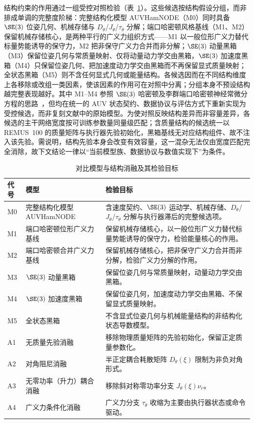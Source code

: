 结构约束的作用通过一组受控对照检验（表~\ref{tab:model-comparison-roles}）。这些候选按结构假设分组，而非排成单调的完整度阶梯：完整结构化模型 AUVHamNODE（M0）同时具备 \(\SE(3)\) 位姿几何、机械存储与 \(D_\theta\)/\(J_\theta\)/\(\tau_\theta\) 分解；端口哈密顿风格基线（M1、M2）保留机械存储核心，是两种平行的广义力组织方式——M1 以一般位形广义力替代标量势能诱导的保守力，M2 把非保守广义力合并而非分解；\(\SE(3)\) 动量黑箱（M3）保留位姿几何与常质量映射、仅将动量动力学交由黑箱，\(\SE(3)\) 加速度黑箱（M4）只保留位姿几何、把加速度动力学交由黑箱而不再保留显式质量映射；全状态黑箱（M5）则不含任何显式几何或能量结构。各候选因而在不同结构维度上各移除或改组一类因素，使该因素的作用可在对照中分离；分组本身不预设结构越完整表现越好。其中 M1--M4 参照 \(\SE(3)\) 哈密顿及李群端口哈密顿神经常微分方程的思路~\citep{duong2021se3hamnode,duong2024liegroupphnode}，但均在统一的 AUV 状态契约、数据协议与评估方式下重新实现为受控候选，而非复刻文献中的原始模型。为使对照反映结构差异而非容量差异，各候选的主干网络宽度按可训练参数量同量级匹配；含质量结构的候选统一以 REMUS~100 的质量矩阵与执行器先验初始化，黑箱基线无对应结构组件、故不注入该先验。需说明，结构先验本身会改变有效容量，这一混杂无法仅由宽度匹配完全消除，故下文结论一律以“当前模型族、数据协议与数值实现下”为条件。

\begin{table}[htbp]
  \centering
  \caption{对比模型与结构消融及其检验目标}
  \label{tab:model-comparison-roles}
  \begin{tabularx}{\textwidth}{l>{\raggedright\arraybackslash}p{}>{\raggedright\arraybackslash}X}
    \toprule
    代号 & 模型 & 检验目标 \\
    \midrule
    M0 & 完整结构化模型 AUVHamNODE & 含速度契约、\(\SE(3)\) 运动学、机械存储、\(D_\theta\)/\(J_\theta\)/\(\tau_\theta\) 分解与执行器滞后的完整候选项。 \\
    M1 & 端口哈密顿位形广义力基线 & 保留机械存储核心，以一般位形广义力替代标量势能诱导的保守力，检验能量核心的作用。 \\
    M2 & 端口哈密顿合并广义力基线 & 保留机械存储核心，把非保守广义力合并而非分解，检验广义力分解的作用。 \\
    M3 & \(\SE(3)\) 动量黑箱 & 保留位姿几何与常质量映射，动量动力学交由黑箱。 \\
    M4 & \(\SE(3)\) 加速度黑箱 & 保留位姿几何，加速度动力学交由黑箱、不保留显式质量映射。 \\
    M5 & 全状态黑箱 & 不含显式位姿几何与机械能量结构的非结构化状态导数模型。 \\
    \midrule
    A1 & 无质量先验消融 & 移除物理质量矩阵的先验初始化，保留正定质量参数化。 \\
    A2 & 对角阻尼消融 & 半正定耦合耗散矩阵 \(D_\theta(\xi)\) 限制为非负对角形式。 \\
    A3 & 无零功率（升力）耦合消融 & 移除斜对称零功率分支 \(J_\theta(\xi)\nu_r\)。 \\
    A4 & 广义力条件化消融 & 广义力分支 \(\tau_\theta\) 收缩为主要由执行器状态或命令驱动。 \\
    \bottomrule
  \end{tabularx}
\end{table}

